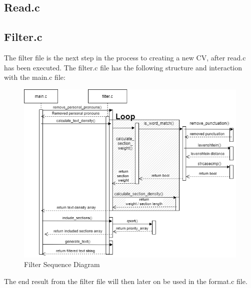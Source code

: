 \subsection{Read.c}
\subsection{Filter.c}
The filter file is the next step in the process to creating a new CV, after read.c has been executed.
The filter.c file has the following structure and interaction with the main.c file:
\begin{figure}[H]
  \centering
  \includegraphics[scale = 0.6]{figures/filter_flow.png}
  \caption{Filter Sequence Diagram}
\end{figure}
The end result from the filter file will then later on be used in the format.c file.

